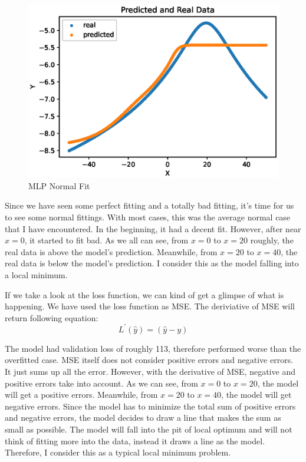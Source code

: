 \documentclass{homework}
\begin{document}
\begin{figure}[h]
  \centering
  \includegraphics[scale=0.7]{multilayer_failure_normal.eps}
  \caption{MLP Normal Fit}
\end{figure}

Since we have seen some perfect fitting and a totally bad fitting, it's time for us to see some normal fittings. With most cases, this was the average normal case that I have encountered. In the beginning, it had a decent fit. However, after near $x=0$, it started to fit bad. As we all can see, from $x=0$ to $x=20$ roughly, the real data is above the model's prediction. Meanwhile, from $x=20$ to $x=40$, the real data is below the model's prediction. I consider this as the model falling into a local minimum. 

If we take a look at the loss function, we can kind of get a glimpse of what is happening. We have used the loss function as MSE. The deriviative of MSE will return following equation:
\[
    L^\prime(\hat{y}) = (\hat{y} - y)
\]

The model had validation loss of roughly 113, therefore performed worse than the overfitted case. MSE itself does not consider positive errors and negative errors. It just sums up all the error. However, with the derivative of MSE, negative and positive errors take into account. As we can see, from $x=0$ to $x=20$, the model will get a positive errors. Meanwhile, from $x=20$ to $x=40$, the model will get negative errors. Since the model has to minimize the total sum of positive errors and negative errors, the model decides to draw a line that makes the sum as small as possible. The model will fall into the pit of local optimum and will not think of fitting more into the data, instead it draws a line as the model. Therefore, I consider this as a typical local minimum problem.
\end{document}
